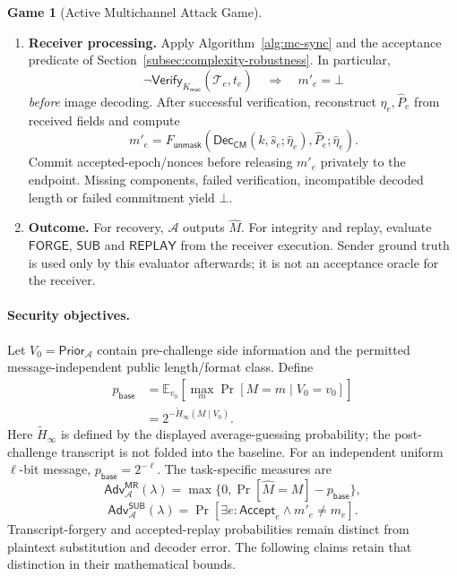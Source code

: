 \documentclass[pdflatex,sn-mathphys-num]{sn-jnl}%
\theoremstyle{definition}
\theoremstyle{game}
\newtheorem{game}{Game}[section]
\theoremstyle{thmstyleone}%
\theoremstyle{thmstyletwo}%
\theoremstyle{thmstylethree}%
\begin{document}
\begin{game}[Active Multichannel Attack Game]
\begin{enumerate}[label=\Alph*.,leftmargin=2.2em]
\item \textbf{Receiver processing.}
Apply Algorithm~\ref{alg:mc-sync} and the acceptance predicate of
Section~\ref{subsec:complexity-robustness}. In particular,
\[
\neg\mathsf{Verify}_{K_{\mathsf{mac}}}(\widehat{\mathcal T}_e,t_e)
\quad\Longrightarrow\quad m'_e=\bot
\]
\emph{before} image decoding. After successful verification, reconstruct
$\widehat\eta_e,\widehat P_e$ from received fields and compute
\[
 m'_e=F_{\mathsf{unmask}}
 (\mathsf{Dec}_{\mathsf{CM}}(k,\widehat s_e;\widehat\eta_e),\widehat P_e;\widehat\eta_e).
\]
Commit accepted-epoch/nonces before releasing $m'_e$ privately to the endpoint.
Missing components, failed verification, incompatible decoded length or
failed commitment yield $\bot$.

\item \textbf{Outcome.}
For recovery, $\mathcal A$ outputs $\widehat M$.
For integrity and replay, evaluate $\mathsf{FORGE}$, $\mathsf{SUB}$ and
$\mathsf{REPLAY}$ from the receiver execution. Sender ground truth is used
only by this evaluator afterwards; it is not an acceptance oracle for the receiver.
\end{enumerate}
\end{game}

\paragraph{Security objectives.}
Let $V_0=\mathsf{Prior}_{\mathcal A}$ contain pre-challenge side information
and the permitted message-independent public length/format class. Define
\begin{equation}\label{eq:message_guessing_baseline}
\begin{aligned}
p_{\mathsf{base}}
 &=\mathbb E_{v_0}\!\left[\max_m\Pr[M=m\mid V_0=v_0]\right]\\
 &=2^{-\widetilde H_\infty(M\mid V_0)}.
\end{aligned}
\end{equation}
Here $\widetilde H_\infty$ is defined by the displayed average-guessing
probability; the post-challenge transcript is not folded into the baseline.
For an independent uniform $\ell$-bit message, $p_{\mathsf{base}}=2^{-\ell}$.
The task-specific measures are
\begin{equation}\label{eq:message_recovery_advantage}
\mathsf{Adv}^{\mathsf{MR}}_{\mathcal A}(\lambda)
=\max\{0,\Pr[\widehat M=M]-p_{\mathsf{base}}\},
\end{equation}
\begin{equation}\label{eq:message_substitution_advantage}
\mathsf{Adv}^{\mathsf{SUB}}_{\mathcal A}(\lambda)
=\Pr[\exists e:\mathsf{Accept}_e\wedge m'_e\ne m_e].
\end{equation}
Transcript-forgery and accepted-replay probabilities remain distinct from
plaintext substitution and decoder error. The following claims retain that
distinction in their mathematical bounds.
\end{document}
